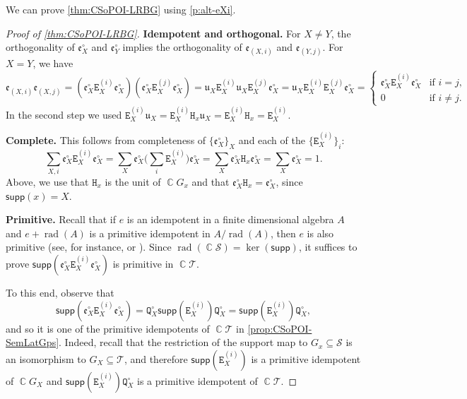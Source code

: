 \documentclass[11pt, oneside, reqno]{amsart}
\theoremstyle{definition}
\numberwithin{equation}{section}
\DeclareMathOperator{\C}{\mathbb{C}}
\def \SS{{\mathcal{S}}}
\def \TT{{\mathcal{T}}}
\def \kk{\C}
\def \uu{{\mathfrak{u}}}
\def \ee{{\mathfrak{e}}}
\def \supp{\mathsf{supp}}
\DeclareMathOperator{\rad}{rad} 		%
\newcommand{\B}[1]{\mathtt{#1}} 			%
\begin{document}
We can prove \cref{thm:CSoPOI-LRBG} using \cref{p:alt-eXi}.
\begin{proof}[Proof of \cref{thm:CSoPOI-LRBG}]
    \noindent\textbf{Idempotent and orthogonal.}
        For $X \neq Y$, the orthogonality of $\ee^\circ_X$ and $\ee^\circ_Y$ implies the orthogonality of $\ee_{(X,i)}$
        and $\ee_{(Y,j)}$.
        For $X = Y$, we have
        \[
            \ee_{(X,i)} \ee_{(X,j)} =
            (\ee^\circ_X \B{E}^{(i)}_X \ee^\circ_X) (\ee^\circ_X \B{E}^{(j)}_X \ee^\circ_X)
            = \uu_{X} \B{E}^{(i)}_X \uu_X \B{E}^{(j)}_X \ee^\circ_X
            = \uu_{X} \B{E}^{(i)}_X \B{E}^{(j)}_X \ee^\circ_X
            = \begin{cases}
                \ee^\circ_X \B{E}^{(i)}_X \ee^\circ_X   & \text{if } i = j,\\
                0                                   & \text{if } i \neq j.
            \end{cases}
        \]
        In the second step we used $\B{E}^{(i)}_X \uu_X = \B{E}^{(i)}_X \B{H}_x \uu_X = \B{E}^{(i)}_X \B{H}_x = \B{E}^{(i)}_X$.

    \medskip
    \noindent\textbf{Complete.}
        This follows from completeness of $\{ \ee^\circ_X \}_X$ and each of the $\{ \B{E}^{(i)}_X \}_i$:
        \[
            \sum_{X,i} \ee^\circ_X \B{E}^{(i)}_X \ee^\circ_X = \sum_X \ee^\circ_X \Big( \sum_i \B{E}^{(i)}_X \Big) \ee^\circ_X = \sum_X \ee^\circ_X \B{H}_x \ee^\circ_X = \sum_X \ee^\circ_X = 1.
        \]
        Above, we use that $\B{H}_x$ is the unit of $\kk G_x$ and that $\ee^\circ_X \B{H}_x = \ee^\circ_X$, since $\supp(x) = X$.

    \medskip
    \noindent\textbf{Primitive.}
        Recall that if $e$ is an idempotent in a finite dimensional algebra $A$ and
        $e + \rad(A)$ is a primitive idempotent in $A/\rad(A)$,
        then $e$ is also primitive
        (see, for instance, \citep[Lemma~D.28]{am17} or \citep[Corollary~1.7.4]{Benson1998:I}).
        Since $\rad(\kk \SS) = \ker(\supp)$,
        it suffices to prove $\supp(\ee^\circ_X \B{E}^{(i)}_X \ee^\circ_X)$
        is primitive in $\kk \TT$.

        To this end, observe that
        \[
            \supp(\ee^\circ_X \B{E}^{(i)}_X \ee^\circ_X) = 
            \B{Q}^\circ_X \supp(\B{E}^{(i)}_X) \B{Q}^\circ_X =
            \supp(\B{E}^{(i)}_X) \B{Q}^\circ_X,
        \]
        and so it
        is one of the primitive idempotents of $\kk \TT$ in \cref{prop:CSoPOI-SemLatGps}.
        Indeed, recall that the restriction of the support map to $G_x \subseteq \SS$ is an isomorphism to $G_X \subseteq \TT$, and therefore $\supp(\B{E}^{(i)}_X)$ is a primitive idempotent of $\kk G_X$ and $\supp(\B{E}^{(i)}_X) \B{Q}^\circ_X$ is a primitive idempotent of $\kk \TT$.
\end{proof}
\end{document}
